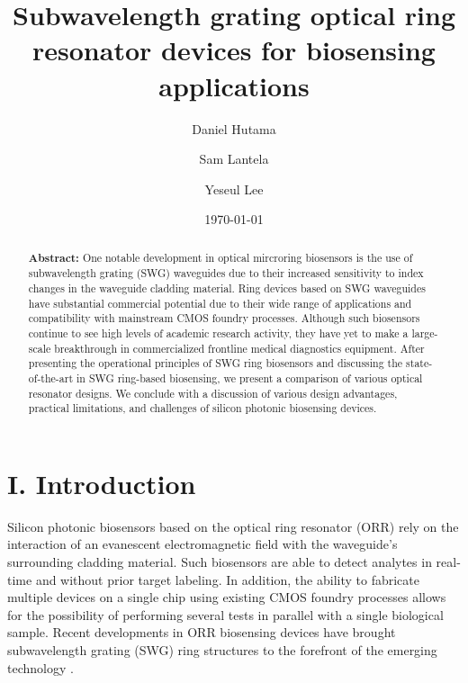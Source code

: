 \documentclass[aps,prl,twocolumn, superscriptaddress,nobalancelastpage]{revtex4}
\begin{document}
\title{Subwavelength grating optical ring resonator devices for biosensing applications} 



\author{Daniel Hutama}
\author{Sam Lantela}
\author{Yeseul Lee}

\date{\today}
\begin{abstract}
\noindent \textbf{Abstract:}  One notable development in optical mircroring biosensors is the use of subwavelength grating (SWG) waveguides due to their increased sensitivity to index changes in the waveguide cladding material.  Ring devices based on SWG waveguides have substantial commercial potential due to their wide range of applications and compatibility with mainstream CMOS foundry processes.  Although such biosensors continue to see high levels of academic research activity, they have yet to make a large-scale breakthrough in commercialized frontline medical diagnostics equipment.  After presenting the operational principles of SWG ring biosensors and discussing the state-of-the-art in SWG ring-based biosensing, we present a comparison of various optical resonator designs. We conclude with a discussion of various design advantages, practical limitations, and challenges of silicon photonic biosensing devices.
\end{abstract}
\pacs{}
\maketitle

\section{I. Introduction}
\vspace{-1em}

Silicon photonic biosensors based on the optical ring resonator (ORR) rely on the interaction of an evanescent electromagnetic field with the waveguide's surrounding cladding material. Such biosensors are able to detect analytes in real-time and without prior target labeling. In addition, the ability to fabricate multiple devices on a single chip using existing CMOS foundry processes allows for the possibility of performing several tests in parallel with a single biological sample. Recent developments in ORR biosensing devices have brought subwavelength grating (SWG) ring structures to the forefront of the emerging technology \cite{swg1, swg2, labelfree}.
\end{document}
